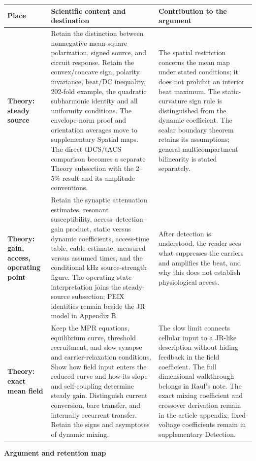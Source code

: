 \documentclass[11pt,a4paper,landscape]{article}
\newcommand{\pagetitle}[2]{%
  {\Large\sffamily\bfseries\color{ink}#1\par}
  \vspace{2pt}{\normalsize #2\par}\vspace{5pt}}
\begin{document}
\begin{tabularx}{\textwidth}{@{}L{43mm}YY@{}}
\toprule
\textbf{Place} & \textbf{Scientific content and destination} & \textbf{Contribution to the argument}\\
\midrule
\textbf{Theory: steady source} & Retain the distinction between nonnegative mean-square polarization, signed source, and circuit response. Retain the convex/concave sign, polarity invariance, beat/DC inequality, 202-fold example, the quadratic subharmonic identity and all uniformity conditions. The envelope-norm proof and orientation averages move to supplementary Spatial maps. The direct tDCS/tACS comparison becomes a separate Theory subsection with the 2--5\% result and its amplitude conventions. & The spatial restriction concerns the mean map under stated conditions; it does not prohibit an interior beat maximum. The static-curvature sign rule is distinguished from the dynamic coefficient. The scalar boundary theorem retains its assumptions; general multicompartment bilinearity is stated separately.\\[8pt]
\textbf{Theory: gain, access, operating point} & Retain the synaptic attenuation estimates, resonant susceptibility, access--detection--gain product, static versus dynamic coefficients, access-time table, cable estimate, measured versus assumed times, and the conditional kHz source-strength figure. The operating-state interpretation joins the steady-source subsection; PEIX identities remain beside the JR model in Appendix B. & After detection is understood, the reader sees what suppresses the carriers and amplifies the beat, and why this does not establish physiological access.\\[8pt]
\textbf{Theory: exact mean field} & Keep the MPR equations, equilibrium curve, threshold recruitment, and slow-synapse and carrier-relaxation conditions. Show how field input enters the reduced curve and how its slope and self-coupling determine steady gain. Distinguish current conversion, bare transfer, and internally recurrent transfer. Retain the signs and asymptotes of dynamic mixing. & The slow limit connects cellular input to a JR-like description without hiding feedback in the field coefficient. The full dimensional walkthrough belongs in Raul's note. The exact mixing coefficient and crossover derivation remain in the article appendix; fixed-voltage coefficients remain in supplementary Detection.\\[8pt]
\bottomrule\end{tabularx}
\newpage
\pagetitle{Argument and retention map}{Section order in the revised article and supplement}
\end{document}
